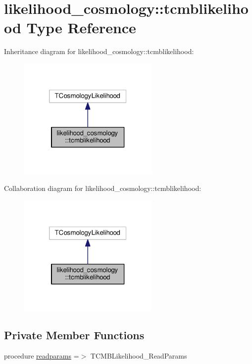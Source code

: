 \hypertarget{structlikelihood__cosmology_1_1tcmblikelihood}{}\section{likelihood\+\_\+cosmology\+:\+:tcmblikelihood Type Reference}
\label{structlikelihood__cosmology_1_1tcmblikelihood}


Inheritance diagram for likelihood\+\_\+cosmology\+:\+:tcmblikelihood\+:
\nopagebreak
\begin{figure}[H]
\begin{center}
\leavevmode
\includegraphics[width=194pt]{structlikelihood__cosmology_1_1tcmblikelihood__inherit__graph}
\end{center}
\end{figure}


Collaboration diagram for likelihood\+\_\+cosmology\+:\+:tcmblikelihood\+:
\nopagebreak
\begin{figure}[H]
\begin{center}
\leavevmode
\includegraphics[width=194pt]{structlikelihood__cosmology_1_1tcmblikelihood__coll__graph}
\end{center}
\end{figure}
\subsection*{Private Member Functions}
\begin{DoxyCompactItemize}
\item 
procedure \mbox{\hyperlink{structlikelihood__cosmology_1_1tcmblikelihood_a9c51e3006da44a2f83e21e9fdd159fec}{readparams}} =$>$ T\+C\+M\+B\+Likelihood\+\_\+\+Read\+Params
\end{DoxyCompactItemize}


